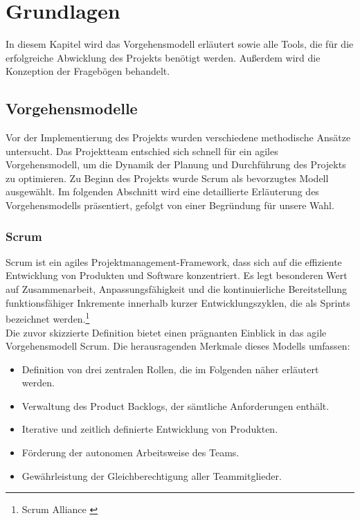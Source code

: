 \chapter{Grundlagen}
In diesem Kapitel wird das Vorgehensmodell erläutert sowie alle Tools, die für die erfolgreiche Abwicklung des Projekts
benötigt werden. Außerdem wird die Konzeption der Fragebögen behandelt.

\section{Vorgehensmodelle}
Vor der Implementierung des Projekts wurden verschiedene methodische Ansätze untersucht. Das Projektteam entschied sich
schnell für ein agiles Vorgehensmodell, um die Dynamik der Planung und Durchführung des Projekts zu optimieren. Zu Beginn
des Projekts wurde Scrum als bevorzugtes Modell ausgewählt. Im folgenden Abschnitt wird eine detaillierte Erläuterung
des Vorgehensmodells präsentiert, gefolgt von einer Begründung für unsere Wahl.

\subsection{Scrum}
Scrum ist ein agiles Projektmanagement-Framework, dass sich auf die effiziente Entwicklung von Produkten und Software
konzentriert. Es legt besonderen Wert auf Zusammenarbeit, Anpassungsfähigkeit und die kontinuierliche Bereitstellung
funktionsfähiger Inkremente innerhalb kurzer Entwicklungszyklen, die als Sprints bezeichnet werden.\footnote{Scrum Alliance \cite{WHAT-IS-SCRUM}}\\

Die zuvor skizzierte Definition bietet einen prägnanten Einblick in das agile Vorgehensmodell Scrum. Die herausragenden
Merkmale dieses Modells umfassen:

\begin{itemize}
    \item Definition von drei zentralen Rollen, die im Folgenden näher erläutert werden.
    \item Verwaltung des Product Backlogs, der sämtliche Anforderungen enthält.
    \item Iterative und zeitlich definierte Entwicklung von Produkten.
    \item Förderung der autonomen Arbeitsweise des Teams.
    \item Gewährleistung der Gleichberechtigung aller Teammitglieder.
\end{itemize}

